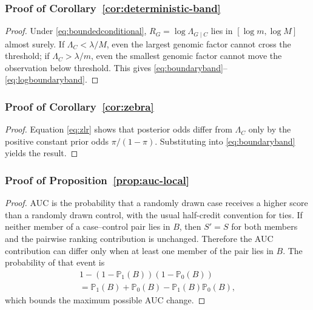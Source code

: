 \subsubsection*{Proof of Corollary~\ref{cor:deterministic-band}}
\begin{proof}
Under \eqref{eq:boundedconditional}, $R_G=\log \Lambda_{G\mid C}$ lies in $[\log m,\log M]$ almost surely. If $\Lambda_C<\lambda/M$, even the largest genomic factor cannot cross the threshold; if $\Lambda_C>\lambda/m$, even the smallest genomic factor cannot move the observation below threshold. This gives \eqref{eq:boundaryband}--\eqref{eq:logboundaryband}.
\end{proof}

\subsubsection*{Proof of Corollary~\ref{cor:zebra}}
\begin{proof}
Equation \eqref{eq:zlr} shows that posterior odds differ from $\Lambda_C$ only by the positive constant prior odds $\pi/(1-\pi)$. Substituting into \eqref{eq:boundaryband} yields the result.
\end{proof}

\subsubsection*{Proof of Proposition~\ref{prop:auc-local}}
\begin{proof}
AUC is the probability that a randomly drawn case receives a higher score than a randomly drawn control, with the usual half-credit convention for ties. If neither member of a case--control pair lies in $B$, then $S'=S$ for both members and the pairwise ranking contribution is unchanged. Therefore the AUC contribution can differ only when at least one member of the pair lies in $B$. The probability of that event is
\begin{multline}
1-(1-\mathbb P_1(B))(1-\mathbb P_0(B))\\
=\mathbb P_1(B)+\mathbb P_0(B)-\mathbb P_1(B)\mathbb P_0(B),
\end{multline}
which bounds the maximum possible AUC change.
\end{proof}


